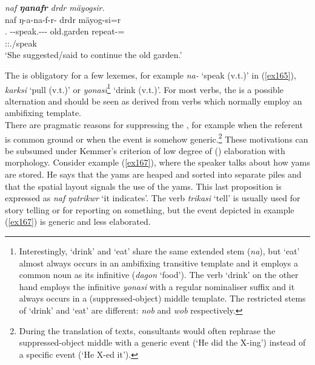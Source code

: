 \begin{exe}
	\ex \emph{naf \textbf{ŋanafr} drdr mäyogsir.}\\
	\glll naf ŋ-a-na-f-r-\Zero{} drdr mäyog-si=r\\
	\Tsg.\Erg{} \M-\Vc-speak.\Rs-\Ndu-\Lk-\Stsg{} old.garden repeat-\Nmlz=\Purp\\
	{} \footnotesize{\Stsg:\Sbj:\Nonpast.\Ipfv/speak} {} {}\\
	\trans `She suggested/said to continue the old garden.'
	\label{ex165}
\end{exe}

The   is obligatory for a few lexemes, for example \emph{na-} `speak (v.t.)' in (\ref{ex165}), \emph{karksi} `pull (v.t.)' or \emph{yonasi}\footnote{Interestingly, `drink' and `eat' share the same extended stem (\emph{na}), but `eat' almost always occurs in an ambifixing transitive template and it employs a common noun as its infinitive (\emph{dagon} `food'). The verb `drink' on the other hand employs the infinitive \emph{yonasi} with a regular nominaliser suffix and it always occurs in a (suppressed-object) middle template. The restricted stems of `drink' and `eat' are different: \emph{nob} and \emph{wob} respectively.} `drink (v.t.)'. For most verbs, the   is a possible alternation and should be seen as derived from verbs which normally employ an ambifixing  template.\\

There are pragmatic reasons for suppressing the , for example when the referent is common ground or when the event is somehow generic.\footnote{During the translation of texts, consultants would often rephrase the suppressed-object middle with a generic event (`He did the X-ing') instead of a specific event (`He X-ed it').} These motivations can be subsumed under Kemmer's criterion of low degree of () elaboration with  morphology. Consider example (\ref{ex167}), where the speaker talks about how yams are stored. He says that the yams are heaped and sorted into separate piles and that the spatial layout signals the use of the yams. This last proposition is expressed as \emph{naf ŋatrikwr} `it indicates'. The verb \emph{trikasi} `tell' is usually used for story telling or for reporting on something, but the event depicted in example (\ref{ex167}) is generic and less elaborated.

